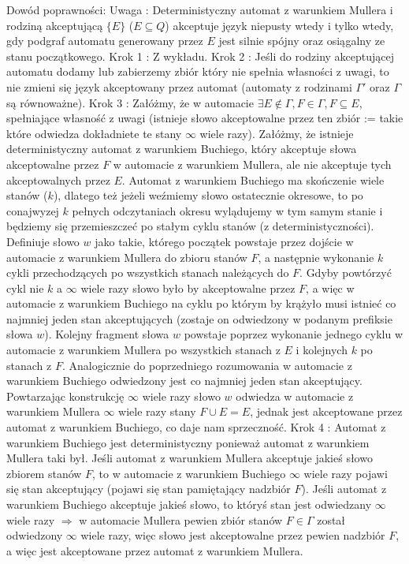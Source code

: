\documentclass{article}
\begin{document}
Dowód poprawności:\newline
Uwaga : Deterministyczny automat z warunkiem Mullera i rodziną akceptującą $\{E\}$ ($E\subseteq Q$) akceptuje język niepusty wtedy i tylko wtedy,
gdy podgraf automatu generowany przez $E$ jest silnie spójny oraz osiągalny ze stanu początkowego.\newline
Krok 1 : Z wykładu.\newline
Krok 2 : Jeśli do rodziny akceptującej automatu dodamy lub zabierzemy zbiór który nie spełnia własności z uwagi,
to nie zmieni się język akceptowany przez automat (automaty z rodzinami $\Gamma'$ oraz $\Gamma$ są równoważne).\newline
Krok 3 : Załóżmy, że w automacie $\exists E\notin\Gamma,F\in\Gamma,F\subseteq E$, spełniające własność z uwagi
(istnieje słowo akceptowalne przez ten zbiór := takie które odwiedza dokładniete te stany $\infty$ wiele razy).\newline
Załóżmy, że istnieje deterministyczny automat z warunkiem Buchiego, który akceptuje słowa akceptowalne przez $F$ w automacie z warunkiem Mullera,
ale nie akceptuje tych akceptowalnych przez $E$.
Automat z warunkiem Buchiego ma skończenie wiele stanów ($k$), dlatego też jeżeli weźmiemy słowo ostatecznie okresowe,
to po conajwyzej $k$ pełnych odczytaniach okresu wylądujemy w tym samym stanie i będziemy się przemieszczeć po stałym cyklu stanów (z deterministyczności).
Definiuje słowo $w$ jako takie, którego początek powstaje przez dojście w automacie z warunkiem Mullera do zbioru stanów $F$,
a następnie wykonanie $k$ cykli przechodzących po wszystkich stanach należących do $F$. Gdyby powtórzyć cykl nie $k$ a $\infty$ wiele razy
słowo było by akceptowalne przez $F$, a więc w automacie z warunkiem Buchiego na cyklu po którym by krążyło musi istnieć co najmniej jeden stan akceptujących
(zostaje on odwiedzony w podanym prefiksie słowa $w$). Kolejny fragment słowa $w$ powstaje poprzez wykonanie jednego cyklu
w automacie z warunkiem Mullera po wszystkich stanach z $E$ i kolejnych $k$ po stanach z $F$.
Analogicznie do poprzedniego rozumowania w automacie z warunkiem Buchiego odwiedzony jest co najmniej jeden stan akceptujący.
Powtarzając konstrukcję $\infty$ wiele razy słowo $w$ odwiedza w automacie z warunkiem Mullera $\infty$ wiele razy stany $F\cup E=E$,
jednak jest akceptowane przez automat z warunkiem Buchiego, co daje nam sprzeczność.\newline
Krok 4 : Automat z warunkiem Buchiego jest deterministyczny ponieważ automat z warunkiem Mullera taki był.\newline
Jeśli automat z warunkiem Mullera akceptuje jakieś słowo zbiorem stanów $F$,
to w automacie z warunkiem Buchiego $\infty$ wiele razy pojawi się stan akceptujący (pojawi się stan pamiętający nadzbiór $F$).\newline
Jeśli automat z warunkiem Buchiego akceptuje jakieś słowo, to któryś stan jest odwiedzany $\infty$ wiele razy $\Rightarrow$ w automacie Mullera
pewien zbiór stanów $F\in\Gamma$ został odwiedzony $\infty$ wiele razy, więc słowo jest akceptowalne przez pewien nadzbiór $F$,
a więc jest akceptowane przez automat z warunkiem Mullera.
\end{document}
